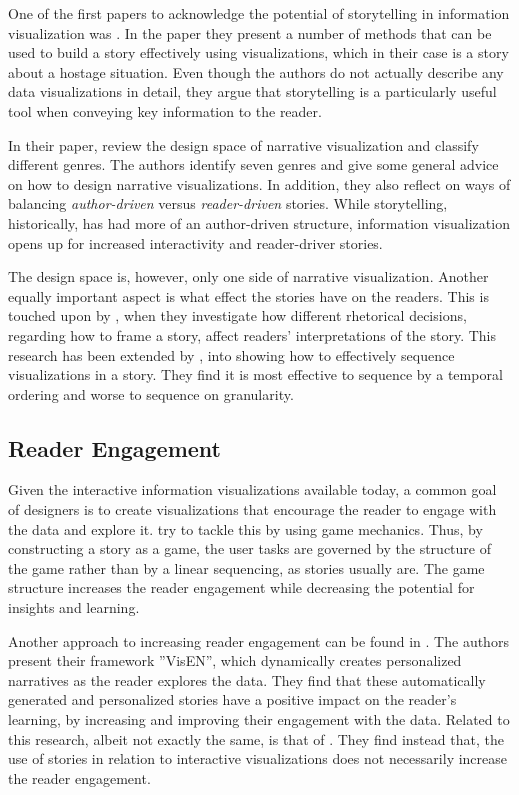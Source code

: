 \documentclass[a4paper,11pt,oldfontcommands]{packages/kth-mag}
\begin{document}
One of the first papers to acknowledge the potential of storytelling in information visualization was \citet{gershon2001storytelling}. In the paper they present a number of methods that can be used to build a story effectively using visualizations, which in their case is a story about a hostage situation. Even though the authors do not actually describe any data visualizations in detail, they argue that storytelling is a particularly useful tool when conveying key information to the reader. 

In their paper, \citet{segel2010narrative} review the design space of narrative visualization and classify different genres. The authors identify seven genres and give some general advice on how to design narrative visualizations. In addition, they also reflect on ways of balancing \emph{author-driven} versus \emph{reader-driven} stories. While storytelling, historically, has had more of an author-driven structure, information visualization opens up for increased interactivity and reader-driver stories.

The design space is, however, only one side of narrative visualization. Another equally important aspect is what effect the stories have on the readers. This is touched upon by \citet{hullman2011visualization}, when they investigate how different rhetorical decisions, regarding how to frame a story, affect readers' interpretations of the story. This research has been extended by \citet{hullman2013deeper}, into showing how to effectively sequence visualizations in a story. They find it is most effective to sequence by a temporal ordering and worse to sequence on granularity.

\subsection{Reader Engagement}
Given the interactive information visualizations available today, a common goal of designers is to create visualizations that encourage the reader to engage with the data and explore it. \citet{diakopoulos2011playable} try to tackle this by using game mechanics. Thus, by constructing a story as a game, the user tasks are governed by the structure of the game rather than by a linear sequencing, as stories usually are. The game structure increases the reader engagement while decreasing the potential for insights and learning.

Another approach to increasing reader engagement can be found in \citet{yousuf2014constructing}. The authors present their framework ''VisEN'', which dynamically creates personalized narratives as the reader explores the data. They find that these automatically generated and personalized stories have a positive impact on the reader's learning, by increasing and improving their engagement with the data. Related to this research, albeit not exactly the same, is that of \citet{boy2015can}. They find instead that, the use of stories in relation to interactive visualizations does not necessarily increase the reader engagement.
\end{document}
